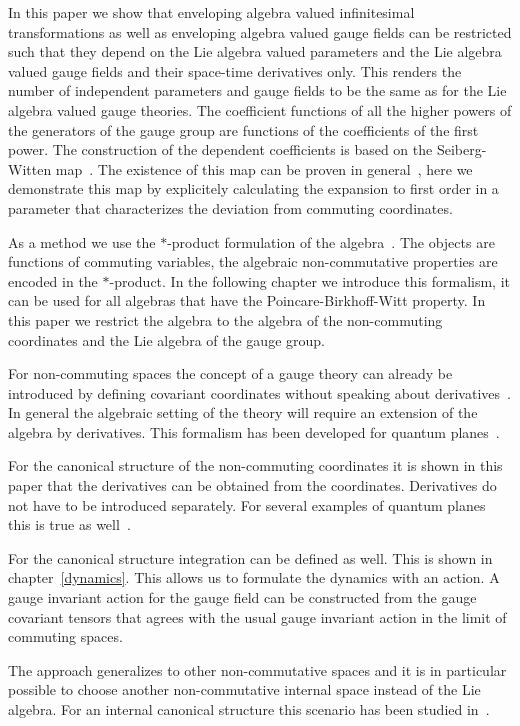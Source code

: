 \documentclass[a4paper,11pt]{article}
\begin{document}
In this paper we show that enveloping algebra valued 
infinitesimal transformations as well as  enveloping
algebra valued gauge fields can be restricted such that they
depend on the Lie algebra valued parameters and the Lie 
algebra valued gauge fields and their space-time derivatives only.
This renders the number of independent parameters and
gauge fields to be the same as for the Lie algebra valued
gauge theories. The coefficient functions of all the higher powers
of the generators of the gauge group are functions of the
coefficients of the first power. The construction of the 
dependent coefficients is based on the Seiberg-Witten map~\cite{SW}.
The existence of this map can be proven in general~\cite{JS,JSW,JSW2}, here we
demonstrate this map by explicitely calculating the expansion to first order
in a parameter that characterizes the deviation from commuting coordinates.

As a method we use the $*$-product formulation of the
algebra~\cite{Weyl,Wigner,Moyal,BFFLS,Kontsevich,Sternheimer}. The objects are
functions of commuting variables, the algebraic  non-commutative properties
are encoded in the $*$-product. In the following chapter we introduce this
formalism, it can be used for all algebras that have the
Poincare-Birkhoff-Witt property. In this paper we restrict the algebra to the
algebra of the non-commuting  coordinates and the Lie algebra of the gauge
group. 

For non-commuting spaces the concept of a gauge theory
can already be introduced by defining covariant coordinates
without speaking about derivatives~\cite{MSSW}. 
In general the algebraic setting of the theory will require
an extension of the algebra by derivatives. This formalism has
been developed for quantum planes~\cite{WZ}. 

For the canonical structure
of the non-commuting coordinates it is shown in this paper that
the derivatives can be obtained from the coordinates. Derivatives
do not have to be introduced separately. For several examples of
quantum planes this is true as well~\cite{W}.

For the canonical structure integration can be defined as well. This
is shown in chapter~\ref{dynamics}. This allows us to formulate the dynamics with 
an action. A gauge invariant action for the gauge field can be constructed
from the gauge covariant tensors that agrees with the usual 
gauge invariant action in the limit of commuting spaces.

The approach generalizes to other non-commutative spaces and it is in particular
possible to choose another non-commutative internal space instead of the
Lie algebra. For an internal canonical structure this scenario has been studied
in~\cite{Wise}.
\end{document}

